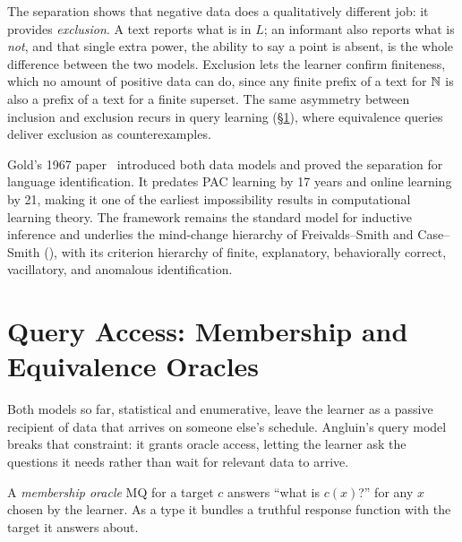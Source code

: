 \begin{remark}
\label{rmk:negative-data}
The separation shows that negative data does a qualitatively different job: it provides \emph{exclusion}. A text reports what is in $L$; an informant also reports what is \emph{not}, and that single extra power, the ability to say a point is absent, is the whole difference between the two models. Exclusion lets the learner confirm finiteness, which no amount of positive data can do, since any finite prefix of a text for $\mathbb{N}$ is also a prefix of a text for a finite superset. The same asymmetry between inclusion and exclusion recurs in query learning (\S\ref{sec:queries}), where equivalence queries deliver exclusion as counterexamples.
\end{remark}

\begin{historical}
Gold's 1967 paper~\cite{Gold1967} introduced both data models and proved the separation for language identification. It predates PAC learning by 17 years and online learning by 21, making it one of the earliest impossibility results in computational learning theory. The framework remains the standard model for inductive inference and underlies the mind-change hierarchy of Freivalds--Smith and Case--Smith (), with its criterion hierarchy of finite, explanatory, behaviorally correct, vacillatory, and anomalous identification.
\end{historical}


\section{Query Access: Membership and Equivalence Oracles}
\label{sec:queries}

Both models so far, statistical and enumerative, leave the learner as a passive recipient of data that arrives on someone else's schedule. Angluin's query model~\cite{Angluin1988} breaks that constraint: it grants oracle access, letting the learner ask the questions it needs rather than wait for relevant data to arrive.

\begin{defn}
\label{def:mq}
A \emph{membership oracle} $\mathrm{MQ}$ for a target $c$ answers ``what is $c(x)$?'' for any $x$ chosen by the learner. As a type it bundles a truthful response function with the target it answers about.
\end{defn}

